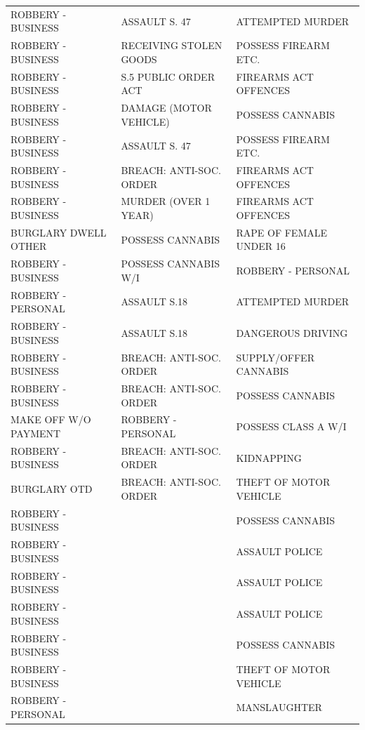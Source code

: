 \documentclass[twocolumn]{svjour3}          %
\theoremstyle{definition}
\begin{document}
\begin{table}[!ht]
{\begin{tabular}{lll}
    ROBBERY - BUSINESS   & ASSAULT S. 47           & ATTEMPTED MURDER        \\
    ROBBERY - BUSINESS   & RECEIVING STOLEN GOODS  & POSSESS FIREARM ETC.    \\
    ROBBERY - BUSINESS   & S.5 PUBLIC ORDER ACT    & FIREARMS ACT OFFENCES   \\
    ROBBERY - BUSINESS   & DAMAGE (MOTOR VEHICLE)  & POSSESS CANNABIS        \\
    ROBBERY - BUSINESS   & ASSAULT S. 47           & POSSESS FIREARM ETC.    \\
    ROBBERY - BUSINESS   & BREACH: ANTI-SOC. ORDER & FIREARMS ACT OFFENCES   \\
    ROBBERY - BUSINESS   & MURDER (OVER 1 YEAR)    & FIREARMS ACT OFFENCES   \\
    BURGLARY DWELL OTHER & POSSESS CANNABIS        & RAPE OF FEMALE UNDER 16 \\
    ROBBERY - BUSINESS   & POSSESS CANNABIS W/I    & ROBBERY - PERSONAL      \\
    ROBBERY - PERSONAL   & ASSAULT S.18            & ATTEMPTED MURDER        \\
    ROBBERY - BUSINESS   & ASSAULT S.18            & DANGEROUS DRIVING      \\
    ROBBERY - BUSINESS   & BREACH: ANTI-SOC. ORDER & SUPPLY/OFFER CANNABIS  \\
    ROBBERY - BUSINESS   & BREACH: ANTI-SOC. ORDER & POSSESS CANNABIS       \\
    MAKE OFF W/O PAYMENT & ROBBERY - PERSONAL      & POSSESS CLASS A W/I    \\
    ROBBERY - BUSINESS   & BREACH: ANTI-SOC. ORDER & KIDNAPPING             \\
    BURGLARY OTD         & BREACH: ANTI-SOC. ORDER & THEFT OF MOTOR VEHICLE \\
    ROBBERY - BUSINESS   &       & POSSESS CANNABIS       \\
    ROBBERY - BUSINESS   &       & ASSAULT POLICE         \\
    ROBBERY - BUSINESS   &       & ASSAULT POLICE         \\
    ROBBERY - BUSINESS   &       & ASSAULT POLICE         \\
    ROBBERY - BUSINESS   &       & POSSESS CANNABIS       \\
    ROBBERY - BUSINESS   &       & THEFT OF MOTOR VEHICLE \\
    ROBBERY - PERSONAL   &       & MANSLAUGHTER           \\

\end{tabular}}
\end{table}
\end{document}
